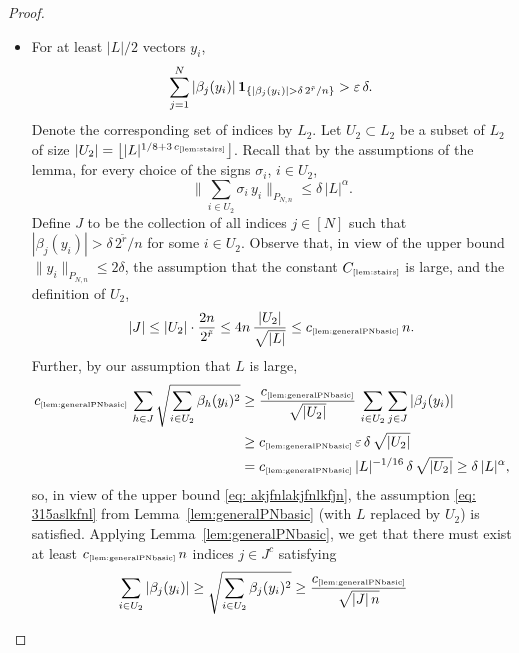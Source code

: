 \documentclass[11pt]{amsart}
\theoremstyle{definition}
\theoremstyle{plain}
\begin{document}
\begin{proof}
\begin{itemize}
    \item[2.] For at least $|L|/2$ vectors $y_i$,
    $$
    \sum_{j=1}^N |\beta_j(y_i)|\,
    {\bf 1}_{\{|\beta_j(y_i)|>\delta\,2^{\tilde r}/n\}}
    > \varepsilon\,\delta.
    $$
    Denote the corresponding set of indices by $L_2$.
    Let $U_2\subset L_2$ be a subset of $L_2$
    of size 
    $|U_2|= \big\lfloor |L|^{1/8+3\,c_{\text{\tiny\ref{lem:stairs}}}}\big\rfloor$.
    Recall that by the assumptions of the lemma, for every
    choice of the signs $\sigma_i$, $i\in U_2$,
    \begin{equation}\label{eq: akjfnlakjfnlkfjn}
    \Big\|\sum_{i\in U_2}\sigma_i\,y_i\Big\|_{P_{N,n}}
    \leq \delta\,|L|^{\alpha}.
    \end{equation}
    Define $J$ to be the collection of all indices
    $j\in[N]$ such that
    $|\beta_j(y_i)|>\delta\,2^{\tilde r}/n$
    for some $i\in U_2$.
    Observe that, in view of the upper bound $\|y_i\|_{P_{N,n}}\leq 2\delta$,
    the assumption that the constant 
    $C_{\text{\tiny\ref{lem:stairs}}}$ is large,
    and the definition of $U_2$,
    \begin{equation}\label{eq:jhbfasafjnalkjnfkajn}
    |J|\leq |U_2|\cdot \frac{2n}{2^{\tilde r}}
    \leq 4n\,\frac{|U_2|}{\sqrt{|L|}}
    \leq c_{\text{\tiny\ref{lem:generalPNbasic}}}\,n.
    \end{equation}
    Further, by our assumption that $L$ is large,
    \begin{align*}
    c_{\text{\tiny\ref{lem:generalPNbasic}}}\,
    \sum_{h\in J}\sqrt{\sum_{i\in U_2}\beta_h(y_i)^2}
    &\geq
    \frac{c_{\text{\tiny\ref{lem:generalPNbasic}}}}{\sqrt{|U_2|}}\,
    \sum_{i\in U_2}\sum_{j\in J}|\beta_j(y_i)|\\
    &\geq c_{\text{\tiny\ref{lem:generalPNbasic}}}\,
    \varepsilon\,\delta\,\sqrt{|U_2|}\\
    &= c_{\text{\tiny\ref{lem:generalPNbasic}}}\,
    |L|^{-1/16}\,\delta\,\sqrt{|U_2|}
    \geq 
    \delta\,|L|^{\alpha},
    \end{align*}
    so, in view of the upper bound \eqref{eq: akjfnlakjfnlkfjn}, the assumption \eqref{eq: 315aslkfnl}
    from Lemma~\ref{lem:generalPNbasic} (with $L$ replaced by $U_2$) is satisfied.
    Applying Lemma~\ref{lem:generalPNbasic},
    we get that there must exist 
    at least $c_{\text{\tiny\ref{lem:generalPNbasic}}}\,n$
    indices $j\in J^c$ satisfying
    \begin{align}
    \sum_{i\in U_2}|\beta_j(y_i)|
    &\geq
    \sqrt{\sum_{i\in U_2}\beta_j(y_i)^2}
    \geq \frac{c_{\text{\tiny\ref{lem:generalPNbasic}}}}{\sqrt{|J|\,n}}\,

\end{align}
\end{itemize}
\end{proof}
\end{document}
